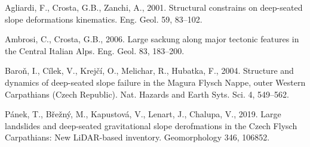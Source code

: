 {Agliardi, F., Crosta, G.B., Zanchi, A., 2001. Structural constrains on deep-seated slope deformations kinematics. Eng. Geol. 59, 83–102.

Ambrosi, C., Crosta, G.B., 2006. Large sackung along major tectonic features in the Central Italian Alps. Eng. Geol. 83, 183–200.
	
Baroň, I., Cílek, V., Krejčí, O., Melichar, R., Hubatka, F., 2004. Structure and dynamics of
deep-seated slope failure in the Magura Flysch Nappe, outer Western Carpathians
(Czech Republic). Nat. Hazards and Earth Syts. Sci. 4, 549–562.
	
Pánek, T., Břežný, M., Kapustová, V., Lenart, J., Chalupa, V., 2019. Large landslides and
deep-seated gravitational slope derofmations in the Czech Flysch Carpathians: New
LiDAR-based inventory. Geomorphology 346, 106852.
}


